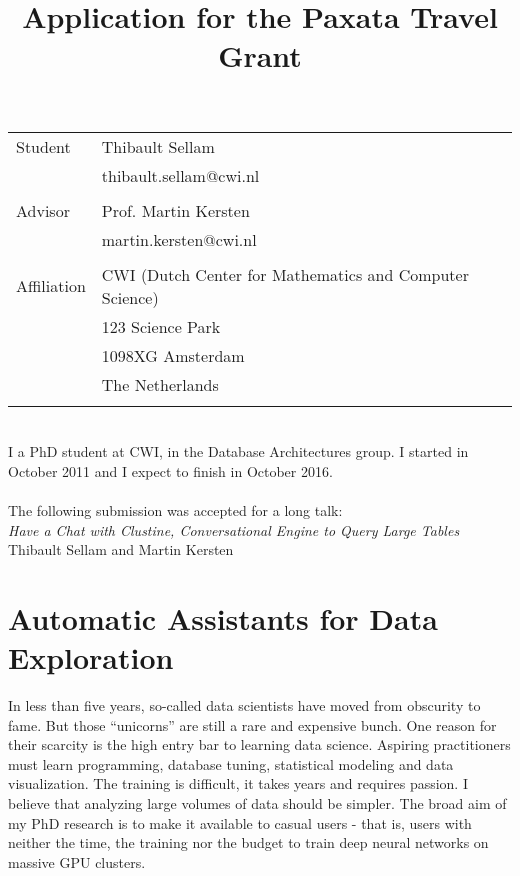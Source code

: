 \documentclass{article}
\begin{document}
\title{Application for the Paxata Travel Grant}
\date{}

\maketitle

\begin{tabular}{ll}
    Student & Thibault Sellam\\
            & thibault.sellam@cwi.nl\\
            & \\
    Advisor & Prof. Martin Kersten\\
            & martin.kersten@cwi.nl\\
            &\\
    Affiliation & CWI (Dutch Center for Mathematics and Computer Science)\\
                & 123 Science Park\\
                & 1098XG Amsterdam\\
                & The Netherlands\\
                & \\
\end{tabular}
~\\
I a PhD student at CWI, in the Database Architectures group. I started in
October 2011 and I expect to finish in October 2016.\\
~\\
The following submission was accepted for a long talk:\\
\emph{Have a Chat with Clustine,
Conversational Engine to Query Large Tables}\\
Thibault Sellam and Martin Kersten
\pagebreak

\section*{Automatic Assistants for Data Exploration}
In less than five years, so-called data scientists have moved from obscurity to
fame. But those ``unicorns'' are still a rare and expensive bunch. One reason
for their scarcity is  the high entry bar to learning data science. Aspiring
practitioners must learn programming, database tuning, statistical modeling and
data visualization. The training is difficult, it takes years and requires
passion.  I believe that analyzing large volumes of data should be simpler. The
broad aim of my PhD research is to make it available to casual users - that
is, users with neither the time, the training nor the budget to train deep
neural networks on massive GPU clusters.
\end{document}
